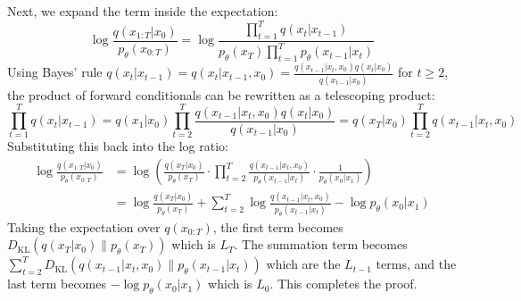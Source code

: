 \documentclass{article}
\begin{document}
{\begin{enumerate}
        Next, we expand the term inside the expectation:
        \begin{equation*}
            \log \frac{q(x_{1:T}|x_0)}{p_\theta(x_{0:T})} = \log \frac{\prod_{t=1}^T q(x_t|x_{t-1})}{p_\theta(x_T) \prod_{t=1}^T p_\theta(x_{t-1}|x_t)}
        \end{equation*}
        Using Bayes' rule $q(x_t|x_{t-1}) = q(x_t|x_{t-1}, x_0) = \frac{q(x_{t-1}|x_t, x_0) q(x_t|x_0)}{q(x_{t-1}|x_0)}$ for $t \ge 2$, the product of forward conditionals can be rewritten as a telescoping product:
        \begin{equation*}
            \prod_{t=1}^T q(x_t|x_{t-1}) = q(x_1|x_0) \prod_{t=2}^T \frac{q(x_{t-1}|x_t, x_0) q(x_t|x_0)}{q(x_{t-1}|x_0)} = q(x_T|x_0) \prod_{t=2}^T q(x_{t-1}|x_t, x_0)
        \end{equation*}
        Substituting this back into the log ratio:
        \begin{align*}
            \log \frac{q(x_{1:T}|x_0)}{p_\theta(x_{0:T})} &= \log \left( \frac{q(x_T|x_0)}{p_\theta(x_T)} \cdot \prod_{t=2}^T \frac{q(x_{t-1}|x_t, x_0)}{p_\theta(x_{t-1}|x_t)} \cdot \frac{1}{p_\theta(x_0|x_1)} \right) \\
            &= \log \frac{q(x_T|x_0)}{p_\theta(x_T)} + \sum_{t=2}^T \log \frac{q(x_{t-1}|x_t, x_0)}{p_\theta(x_{t-1}|x_t)} - \log p_\theta(x_0|x_1)
        \end{align*}
        Taking the expectation over $q(x_{0:T})$, the first term becomes $D_{\mathrm{KL}}(q(x_T|x_0) \| p_\theta(x_T))$ which is $L_T$. The summation term becomes $\sum_{t=2}^T D_{\mathrm{KL}}(q(x_{t-1}|x_t, x_0) \| p_\theta(x_{t-1}|x_t))$ which are the $L_{t-1}$ terms, and the last term becomes $-\log p_\theta(x_0|x_1)$ which is $L_0$. This completes the proof.


\end{enumerate}}
\end{document}
